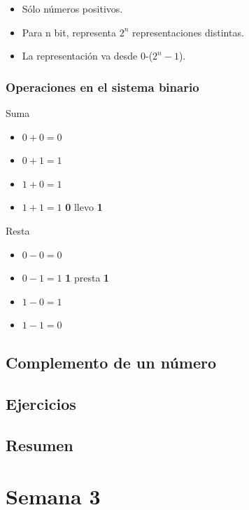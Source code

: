 \documentclass[12pt,letterpaper]{book}
\begin{document}
    \begin{itemize}
    \item Sólo números positivos.
    \item Para n bit, representa $2^n$ representaciones distintas.
    \item La representación va desde 0-($2^n-1$).
    \end{itemize}
   
   \subsection{Operaciones en el sistema binario}

\begin{multicols}{2}
Suma

\begin{itemize}
\item $0+0=0$
\item $0+1=1$
\item $1+0=1$
\item $1+1=1$ \textbf{0} llevo \textbf{1}

\end{itemize}

Resta

\begin{itemize}
\item $0-0=0$
\item $0-1=1$ \textbf{1} presta \textbf{1}
\item $1-0=1$
\item $1-1=0$ 

\end{itemize}
\end{multicols}   
   
  \section{Complemento de un número}
  
   \section{Ejercicios}
   \section{Resumen}

\chapter{Semana 3}
\end{document}
